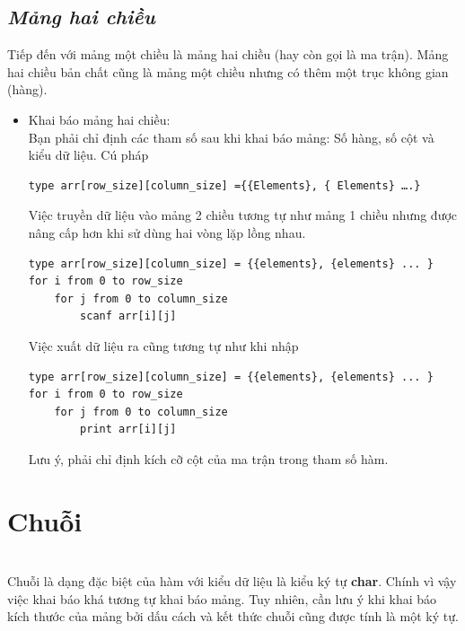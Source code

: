 \documentclass[12pt,a4paper]{article}
\begin{document}
\begin{center}
	\subsection*{\textbf{\textit{Mảng hai chiều}}}
\end{center}
Tiếp đến với mảng một chiều là mảng hai chiều (hay còn gọi là ma trận). Mảng hai chiều bản chất cũng là mảng một chiều nhưng có thêm một trục không gian (hàng). 
\begin{itemize}
	\item Khai báo mảng hai chiều:\\
Bạn phải chỉ định các tham số sau khi khai báo mảng: Số hàng, số cột và kiểu dữ liệu. Cú pháp
\begin{lstlisting}
type arr[row_size][column_size] ={{Elements}, { Elements} ….}
\end{lstlisting}
Việc truyền dữ liệu vào mảng 2 chiều tương tự như mảng 1 chiều nhưng được nâng cấp hơn khi sử dùng hai vòng lặp lồng nhau.
\begin{lstlisting}
type arr[row_size][column_size] = {{elements}, {elements} ... }
for i from 0 to row_size
    for j from 0 to column_size
        scanf arr[i][j]
\end{lstlisting}
Việc xuất dữ liệu ra cũng tương tự như khi nhập
\begin{lstlisting} 
type arr[row_size][column_size] = {{elements}, {elements} ... }
for i from 0 to row_size
    for j from 0 to column_size
        print arr[i][j]
\end{lstlisting}
Lưu ý, phải chỉ định kích cỡ cột của ma trận trong tham số hàm. 
\end{itemize}
\section{Chuỗi}\\
Chuỗi là dạng đặc biệt của hàm với kiểu dữ liệu là kiểu ký tự \textbf{char}. Chính vì vậy việc khai báo khá tương tự khai báo mảng. Tuy nhiên, cần lưu ý khi khai báo kích thước của mảng bởi dấu cách và kết thức chuỗi cũng được tính là một ký tự.\\
\end{document}
